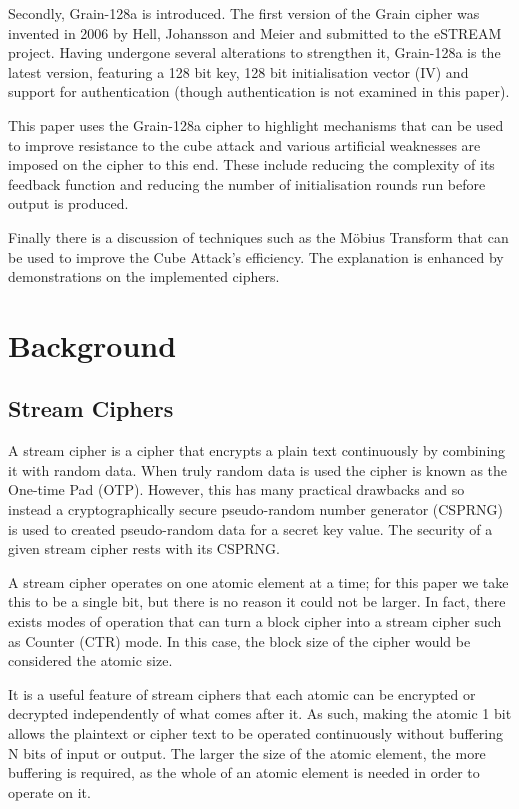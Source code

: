 \documentclass{report}
\let\Oldsection\section
\renewcommand{\section}{\FloatBarrier\Oldsection}
\begin{document}
Secondly, Grain-128a is introduced. The first version of the Grain cipher was invented in 2006 by Hell, Johansson and Meier \cite{Grain128aSpec} and submitted to the eSTREAM project. Having undergone several alterations to strengthen it, Grain-128a is the latest version, featuring a 128 bit key, 128 bit initialisation vector (IV) and support for authentication (though authentication is not examined in this paper).

This paper uses the Grain-128a cipher to highlight mechanisms that can be used to improve resistance to the cube attack and various artificial weaknesses are imposed on the cipher to this end. These include reducing the complexity of its feedback function and reducing the number of initialisation rounds run before output is produced.

Finally there is a discussion of techniques such as the M\"{o}bius Transform that can be used to improve the Cube Attack's efficiency. The explanation is enhanced by demonstrations on the implemented ciphers.

\chapter{Background}
\section{Stream Ciphers}
A stream cipher is a cipher that encrypts a plain text continuously by combining it with random data. When truly random data is used the cipher is known as the One-time Pad (OTP). However, this has many practical drawbacks\cite{} and so instead a cryptographically secure pseudo-random number generator (CSPRNG) is used to created pseudo-random data for a secret key value. The security of a given stream cipher rests with its CSPRNG.

A stream cipher operates on one atomic element at a time; for this paper we take this to be a single bit, but there is no reason it could not be larger. In fact, there exists modes of operation that can turn a block cipher into a stream cipher such as Counter (CTR) mode\cite{}. In this case, the block size of the cipher would be considered the atomic size.

It is a useful feature of stream ciphers that each atomic can be encrypted or decrypted independently of what comes after it. As such, making the atomic 1 bit allows the plaintext or cipher text to be operated continuously without buffering  N bits of input or output. The larger the size of the atomic element, the more buffering is required, as the whole of an atomic element is needed in order to operate on it.
\end{document}
